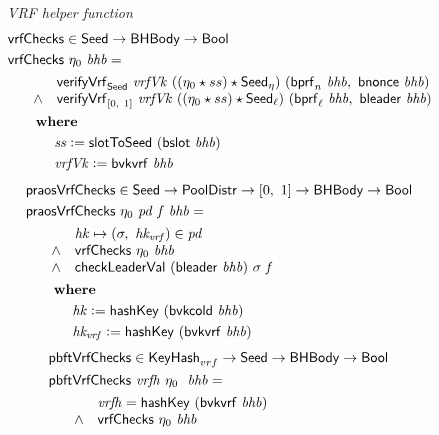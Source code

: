 \begin{figure}
  \emph{VRF helper function}
  \begin{align*}
      & \mathsf{vrfChecks} \in \mathsf{Seed} \to \mathsf{BHBody} \to \mathsf{Bool} \\
      & \mathsf{vrfChecks}~\eta_0~\mathit{bhb} = \\
      & \begin{array}{cl}
        ~~~~ &
             \mathsf{verifyVrf}_{\mathsf{Seed}} ~ \mathit{vrfVk} ~ ((\eta_0\star ss)\star\mathsf{Seed}_\eta) ~(\mathsf{bprf}_{n}~\mathit{bhb},~\mathsf{bnonce}~\mathit{bhb}) \\
        ~~~~ \land &
             \mathsf{verifyVrf}_{[0,~1]} ~ \mathit{vrfVk} ~ ((\eta_0\star ss)\star\mathsf{Seed}_\ell) ~(\mathsf{bprf}_{\ell}~\mathit{bhb},~\mathsf{bleader}~\mathit{bhb}) \\
      \end{array} \\
      & ~~~~~ ~ \mathbf{where}~ ~  \\
      & ~~~~~~~~~~\mathit{ss} \mathrel{\mathop:}= \mathsf{slotToSeed}~ \mathit{(\mathsf{bslot}~\mathit{bhb})} \\
      & ~~~~~~~~~~\mathit{vrfVk} \mathrel{\mathop:}= \mathsf{bvkvrf}~\mathit{bhb} \\
  \end{align*}
  \begin{align*}
      & \mathsf{praosVrfChecks} \in \mathsf{Seed} \to \mathsf{PoolDistr} \to [0,~1] \to \mathsf{BHBody} \to \mathsf{Bool} \\
      & \mathsf{praosVrfChecks}~\eta_0~\mathit{pd}~\mathit{f}~\mathit{bhb} = \\
      & \begin{array}{cl}
        ~~~~ & \mathit{hk}\mapsto (\sigma,~\mathit{hk_{vrf}})\in\mathit{pd} \\
        ~~~~ \land & \mathsf{vrfChecks}~\eta_0~\mathit{bhb} \\
        ~~~~ \land & \mathsf{checkLeaderVal}~(\mathsf{bleader}~\mathit{bhb})~\sigma~\mathit{f} \\
      \end{array} \\
      & ~~~~~ ~ \mathbf{where}~ ~  \\
      & ~~~~~~~~~~\mathit{hk} \mathrel{\mathop:}= \mathsf{hashKey}~ \mathit{(\mathsf{bvkcold}~\mathit{b}hb)} \\
      & ~~~~~~~~~~\mathit{hk_{vrf}} \mathrel{\mathop:}= \mathsf{hashKey}~ \mathit{(\mathsf{bvkvrf}~\mathit{bhb})} \\
  \end{align*}
  \begin{align*}
      & \mathsf{pbftVrfChecks} \in \mathsf{KeyHash}_{vrf} \to \mathsf{Seed} \to \mathsf{BHBody} \to \mathsf{Bool} \\
      & \mathsf{pbftVrfChecks}~\mathit{vrfh}~\eta_0~~\mathit{bhb} = \\
      & \begin{array}{cl}
        ~~~~ & \mathit{vrfh} = \mathsf{hashKey}~ \mathit{(\mathsf{bvkvrf}~\mathit{bhb})} \\
        ~~~~ \land & \mathsf{vrfChecks}~\eta_0~\mathit{bhb} \\
      \end{array} \\
  \end{align*}
  \label{fig:vrf-checks}
\end{figure}

